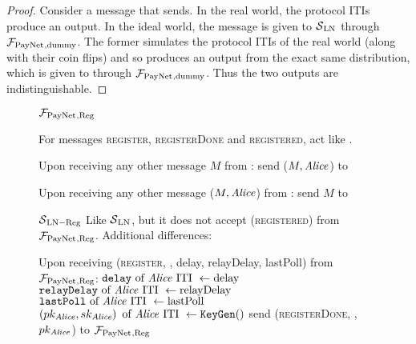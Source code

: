   \begin{proof}
    Consider a message that \environment{} sends. In the real world, the
    protocol ITIs produce an output. In the ideal world, the message is given to
    $\mathcal{S}{}_{\mathrm{LN}}$ through $\mathcal{F}_{\mathrm{PayNet}}{}_{\mathrm{, dummy}}$. The
    former simulates the protocol ITIs of the real world (along with their coin
    flips) and so produces an output from the exact same distribution, which is
    given to \environment{} through $\mathcal{F}_{\mathrm{PayNet}}{}_{\mathrm{, dummy}}$. Thus the
    two outputs are indistinguishable.
  \end{proof}

  \begin{figure}[H]
    \begin{systembox}{$\mathcal{F}_{\mathrm{PayNet}}{}_{\mathrm{, Reg}}$}
      \begin{algorithmic}[1]
        \State For messages \textsc{register}, \textsc{registerDone} and
        \textsc{registered}, act like \fpaynet{}.
        \Statex

        \State Upon receiving any other message $M$ from \alice:
        \Indent
            \State send ($M, \mathit{Alice}$) to \simulator
          \EndIf
        \EndIndent
        \Statex

        \State Upon receiving any other message ($M, \mathit{Alice}$) from \simulator:
        \Indent
            \State send $M$ to \alice
          \EndIf
        \EndIndent
      \end{algorithmic}
    \end{systembox}
    \caption{}
    \label{alg:proof:fpaynet:reg}
  \end{figure}

  \begin{figure}[H]
    \begin{simulatorbox}{$\mathcal{S}{}_{\mathrm{LN - Reg}}$}
      Like $\mathcal{S}{}_{\mathrm{LN}}$, but it does not accept
      (\textsc{registered}) from $\mathcal{F}_{\mathrm{PayNet}}{}_{\mathrm{, Reg}}$.
      Additional differences:
      \begin{algorithmic}[1]
        \State Upon receiving (\textsc{register}, \alice, delay, relayDelay,
        lastPoll) from $\mathcal{F}_{\mathrm{PayNet}}{}_{\mathrm{, Reg}}$:
        \Indent
          \State $\mathtt{delay} \text{ of \ensuremath{\mathit{Alice}}{} ITI } \gets \mathrm{delay}$
          \label{alg:sim:reg:delay}
          \State $\mathtt{relayDelay} \text{ of \ensuremath{\mathit{Alice}}{} ITI } \gets
          \mathrm{relayDelay}$
          \State $\mathtt{lastPoll} \text{ of \ensuremath{\mathit{Alice}}{} ITI } \gets
          \mathrm{lastPoll}$
          \State $\left(pk_{\mathit{Alice}}, sk_{\mathit{Alice}}\right) \text{ of \ensuremath{\mathit{Alice}}{} ITI }
          \gets \mathtt{KeyGen}()$
          \label{alg:sim:reg:keygen}
          \State send (\textsc{registerDone}, \alice, $pk_{\mathit{Alice}}$) to
          $\mathcal{F}_{\mathrm{PayNet}}{}_{\mathrm{, Reg}}$
        \EndIndent
      \end{algorithmic}
    \end{simulatorbox}
    \caption{}
    \label{alg:sim:reg}
  \end{figure}

